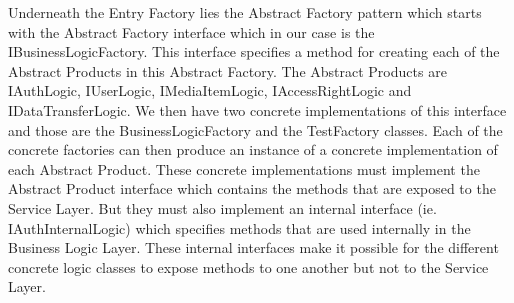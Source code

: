 \documentclass[../report.tex]{subfiles}
\begin{document}
Underneath the Entry Factory lies the Abstract Factory pattern which starts with the Abstract Factory interface which in our case is the IBusinessLogicFactory. This interface specifies a method for creating each of the Abstract Products in this Abstract Factory. The Abstract Products are IAuthLogic, IUserLogic, IMediaItemLogic, IAccessRightLogic and IDataTransferLogic. We then have two concrete implementations of this interface and those are the BusinessLogicFactory and the TestFactory classes. Each of the concrete factories can then produce an instance of a concrete implementation of each Abstract Product. These concrete implementations must implement the Abstract Product interface which contains the methods that are exposed to the Service Layer. But they must also implement an internal interface (ie. IAuthInternalLogic) which specifies methods that are used internally in the Business Logic Layer. These internal interfaces make it possible for the different concrete logic classes to expose methods to one another but not to the Service Layer.
\end{document}
